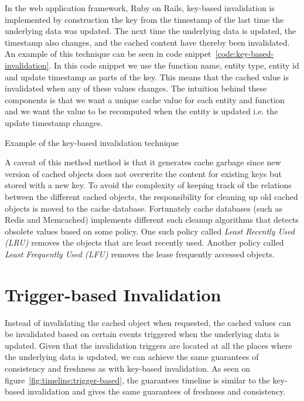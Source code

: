In the web application framework, Ruby on Rails, key-based invalidation is implemented by construction the key from the timestamp of the last time the underlying data was updated. The next time the underlying data is updated, the timestamp also changes, and the cached content have thereby been invalidated. An example of this technique can be seen in code snippet~\ref{code:key-based-invalidation}. In this code snippet we use the function name, entity type, entity id and update timestamp as parts of the key. This means that the cached value is invalidated when any of these values changes. The intuition behind these components is that we want a unique cache value for each entity and function and we want the value to be recomputed when the entity is updated i.e. the update timestamp changes.

\begin{code}{Example of the key-based invalidation technique}
  
  \label{code:key-based-invalidation}
\end{code}

A caveat of this method method is that it generates cache garbage since new version of cached objects does not overwrite the content for existing keys but stored with a new key. To avoid the complexity of keeping track of the relations between the different cached objects, the responsibility for cleaning up old cached objects is moved to the cache database. Fortunately cache databases (such as Redis and Memcached) implements different such cleanup algorithms that detects obsolete values based on some policy. One such policy called \emph{Least Recently Used (LRU)} removes the objects that are least recently used. Another policy called \emph{Least Frequently Used (LFU)} removes the lease frequently accessed objects.


\section{Trigger-based Invalidation}
\label{subsec:trigger_based_invalidation}

Instead of invalidating the cached object when requested, the cached values can be invalidated based on certain events triggered when the underlying data is updated. Given that the invalidation triggers are located at all the places where the underlying data is updated, we can achieve the same guarantees of consistency and freshness as with key-based invalidation. As seen on figure~\ref{fig:timeline:trigger-based}, the guarantees timeline is similar to the key-based invalidation and gives the same guarantees of freshness and consistency.

